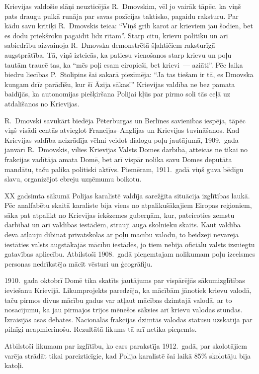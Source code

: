 \documentclass[twoside,a5paper,12pt,fleqn,openany]{extbook}
\begin{document}
Krievijas valdošie slāņi neuzticējās R.~Dmovskim, vēl jo vairāk tāpēc, ka viņš pats draugu pulkā runāja par savas pozīcijas taktisko, pagaidu raksturu. Par kādu savu kritiķi R.~Dmovskis teica: ``Viņš grib karot ar krieviem jau šodien, bet es dodu priekšroku pagaidīt līdz rītam''. Starp citu, krievu politiķu un arī sabiedrību aizvainoja R.~Dmovska demonstrētā šļahtičiem raksturīgā augstprātība. Tā, viņš izteicās, ka patiesu vienošanos starp krievu un poļu tautām traucē tas, ka ``mēs poļi esam eiropieši, bet krievi~--- aziāti''. Pēc laika biedru liecības P.~Stolipins šai sakarā piezīmēja: ``Ja tas tiešam ir tā, es Dmovska kungam drīz parādīšu, kur šī Āzija sākas!'' Krievijas valdība ne bez pamata baidījās, ka autonomijas piešķiršana Polijai kļūs par pirmo soli tās ceļā uz atdalīšanos no Krievijas.

R.~Dmovski savukārt biedēja Pēterburgas un Berlīnes savienības iespēja, tāpēc viņš visādi centās atvieglot Francijas--Anglijas un Krievijas tuvināšanos. Kad Krievijas valdība neizrādīja vēlmi veidot dialogu poļu jautājumā, 1909.~gada janvārī R.~Dmovskis, vīlies Krievijas Valsts Domes darbībā, atteicās ne tikai no frakcijas vadītāja amata Domē, bet arī vispār nolika savu Domes deputāta mandātu, taču palika politiski aktīvs. Piemēram, 1911.~gadā viņš guva bēdīgu slavu, organizējot ebreju uzņēmumu boikotu.

XX gadsimta sākumā Polijas karalistē valdīja sarežģīta situācija izglītības laukā. Pēc analfabētu skaitā karaliste bija viens no atpalikušākajiem Eiropas reģioniem, sāka pat atpalikt no Krievijas iekšzemes guberņām, kur, pateicoties zemstu darbībai un arī valdības iestādēm, strauji auga skolnieku skaits. Kaut valdība deva atļauju dibināt privātskolas ar poļu mācību valodu, to beidzēji nevarēja iestāties valsts augstākajās mācību iestādēs, jo tiem nebija oficiālu valsts izsniegtu gatavības apliecību. Atbilstoši 1908.~gadā pieņemtajam nolikumam poļu izcelsmes personas nedrīkstēja mācīt vēsturi un ģeogrāfiju.

1910.~gada oktobrī Domē tika skatīts jautājums par vispārējās sākumizglītības ieviešanu Krievijā. Likumprojekts paredzēja, ka mācībām jānotiek krievu valodā, taču pirmos divus mācību gadus var atļaut mācības dzimtajā valodā, ar to nosacījumu, ka jau pirmajos trijos mēnešos sāksies arī krievu valodas stundas. Izraisījās asas debates. Nacionālās frakcijas dzimtās valodas statusu uzskatīja par pilnīgi neapmierinošu. Rezultātā likums tā arī netika pieņemts.

Atbilstoši likumam par izglītību, ko cars parakstīja 1912.~gadā, par skolotājiem varēja strādāt tikai pareizticīgie, kad Polija karalistē šai laikā 85\% skolotāju bija katoļi.
\end{document}
